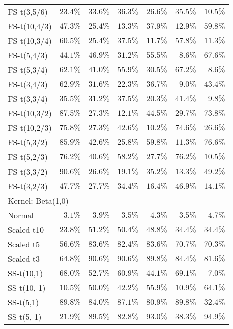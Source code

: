\begin{longtable}{lrrrrrr}
FS-t(3,5/6) & $23.4\%$ & $33.6\%$ & $36.3\%$ & $26.6\%$ & $35.5\%$ & $10.5\%$ \\ 
FS-t(10,4/3) & $47.3\%$ & $25.4\%$ & $13.3\%$ & $37.9\%$ & $12.9\%$ & $59.8\%$ \\ 
FS-t(10,3/4) & $60.5\%$ & $25.4\%$ & $37.5\%$ & $11.7\%$ & $57.8\%$ & $11.3\%$ \\ 
FS-t(5,4/3) & $44.1\%$ & $46.9\%$ & $31.2\%$ & $55.5\%$ & $8.6\%$ & $67.6\%$ \\ 
FS-t(5,3/4) & $62.1\%$ & $41.0\%$ & $55.9\%$ & $30.5\%$ & $67.2\%$ & $8.6\%$ \\ 
FS-t(3,4/3) & $62.9\%$ & $31.6\%$ & $22.3\%$ & $36.7\%$ & $9.0\%$ & $43.4\%$ \\ 
FS-t(3,3/4) & $35.5\%$ & $31.2\%$ & $37.5\%$ & $20.3\%$ & $41.4\%$ & $9.8\%$ \\ 
FS-t(10,3/2) & $87.5\%$ & $27.3\%$ & $12.1\%$ & $44.5\%$ & $29.7\%$ & $73.8\%$ \\ 
FS-t(10,2/3) & $75.8\%$ & $27.3\%$ & $42.6\%$ & $10.2\%$ & $74.6\%$ & $26.6\%$ \\ 
FS-t(5,3/2) & $85.9\%$ & $42.6\%$ & $25.8\%$ & $59.8\%$ & $11.3\%$ & $76.6\%$ \\ 
FS-t(5,2/3) & $76.2\%$ & $40.6\%$ & $58.2\%$ & $27.7\%$ & $76.2\%$ & $10.5\%$ \\ 
FS-t(3,3/2) & $90.6\%$ & $26.6\%$ & $19.1\%$ & $35.2\%$ & $13.3\%$ & $49.2\%$ \\ 
FS-t(3,2/3) & $47.7\%$ & $27.7\%$ & $34.4\%$ & $16.4\%$ & $46.9\%$ & $14.1\%$ \\ 
\midrule
\multicolumn{7}{l}{Kernel: Beta(1,0)} \\ 
\midrule
Normal & $3.1\%$ & $3.9\%$ & $3.5\%$ & $4.3\%$ & $3.5\%$ & $4.7\%$ \\ 
Scaled t10 & $23.8\%$ & $51.2\%$ & $50.4\%$ & $48.8\%$ & $34.4\%$ & $34.4\%$ \\ 
Scaled t5 & $56.6\%$ & $83.6\%$ & $82.4\%$ & $83.6\%$ & $70.7\%$ & $70.3\%$ \\ 
Scaled t3 & $64.8\%$ & $90.6\%$ & $90.6\%$ & $89.8\%$ & $84.4\%$ & $81.6\%$ \\ 
SS-t(10,1) & $68.0\%$ & $52.7\%$ & $60.9\%$ & $44.1\%$ & $69.1\%$ & $7.0\%$ \\ 
SS-t(10,-1) & $10.5\%$ & $50.0\%$ & $42.2\%$ & $55.9\%$ & $10.9\%$ & $64.1\%$ \\ 
SS-t(5,1) & $89.8\%$ & $84.0\%$ & $87.1\%$ & $80.9\%$ & $89.8\%$ & $32.4\%$ \\ 
SS-t(5,-1) & $21.9\%$ & $89.5\%$ & $82.8\%$ & $93.0\%$ & $38.3\%$ & $94.9\%$ \\ 

\end{longtable}
